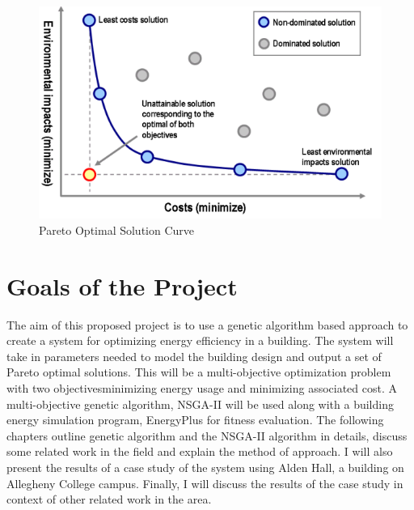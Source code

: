 \begin{figure}[htbp]
\centering
\includegraphics[width = 0.5\linewidth]{images/pareto.png}
\caption{Pareto Optimal Solution Curve \cite{Coley2002}}
\label{fig:pareto}
\end{figure}

\section{Goals of the Project}\label{sec:goals}

The aim of this proposed project is to use a genetic algorithm based approach 
to create a system for optimizing energy efficiency in a building. The system 
will take in parameters needed to model the building design and output a set of Pareto optimal solutions. This will be a multi-objective optimization problem with two objectives\textemdash minimizing energy usage and minimizing associated cost. A multi-objective genetic algorithm, NSGA-II will be used along with a building energy simulation program, EnergyPlus for fitness evaluation. The following chapters outline genetic algorithm and the NSGA-II algorithm in details, discuss some related work in the field and explain the method of approach. I will also present the results of a case study of the system using Alden Hall, a building on Allegheny College campus. Finally, I will discuss the results of the case study in context of other related work in the area.



